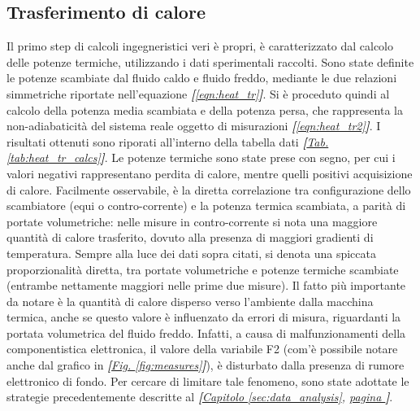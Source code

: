 \documentclass[a4paper,10pt]{article}                                                                                       %
\begin{document}
\subsection{Trasferimento di calore}                                                                                        %
\label{subsec:heat_tr}                                                                                                      %
  Il primo step di calcoli ingegneristici veri è propri, è caratterizzato dal calcolo delle potenze termiche, utilizzando i
  dati sperimentali raccolti. Sono state definite le potenze scambiate dal fluido caldo e fluido freddo, mediante le
  due relazioni simmetriche riportate nell'equazione \textit{\textbf{[}\ref{eqn:heat_tr}\textbf{]}}. Si è proceduto quindi
  al calcolo della potenza media scambiata e della potenza persa, che rappresenta la non-adiabaticità del
  sistema reale oggetto di misurazioni \textit{\textbf{[}\ref{eqn:heat_tr2}\textbf{]}}. I risultati ottenuti sono riporati
  all'interno della tabella dati \textit{\textbf{[}\hyperref[tab:heat_tr_calcs]{Tab. }\ref{tab:heat_tr_calcs}\textbf{]}}.
  Le potenze termiche sono state prese con segno, per cui i valori negativi rappresentano perdita di calore, mentre quelli
  positivi acquisizione di calore. Facilmente osservabile, è la diretta correlazione tra configurazione dello scambiatore
  (equi o contro-corrente) e la potenza termica scambiata, a parità di portate volumetriche: nelle misure in
  contro-corrente si nota una maggiore quantità di calore trasferito, dovuto alla presenza di maggiori gradienti di
  temperatura. Sempre alla luce dei dati sopra citati, si denota una spiccata proporzionalità diretta, tra portate
  volumetriche e potenze termiche scambiate (entrambe nettamente maggiori nelle prime due misure). Il fatto più importante
  da notare è la quantità di calore disperso verso l'ambiente dalla macchina termica, anche se questo valore è influenzato
  da errori di misura, riguardanti la portata volumetrica del fluido freddo. Infatti, a causa di malfunzionamenti della
  componentistica elettronica, il valore della variabile F2 (com'è possibile notare anche dal grafico in
  \textit{\textbf{[}\hyperref[fig:measures]{Fig. }\ref{fig:measures}\textbf{]}}), è disturbato dalla presenza
  di rumore elettronico di fondo. Per cercare di limitare tale fenomeno, sono state adottate le strategie precedentemente
  descritte al \textit{\textbf{[}\hyperref[sec:data_analysis]{Capitolo }\ref{sec:data_analysis},
  \hyperref[sec:data_analysis]{pagina }\pageref{sec:data_analysis}\textbf{]}}.
  \clearpage                                                                                                                %
\end{document}
